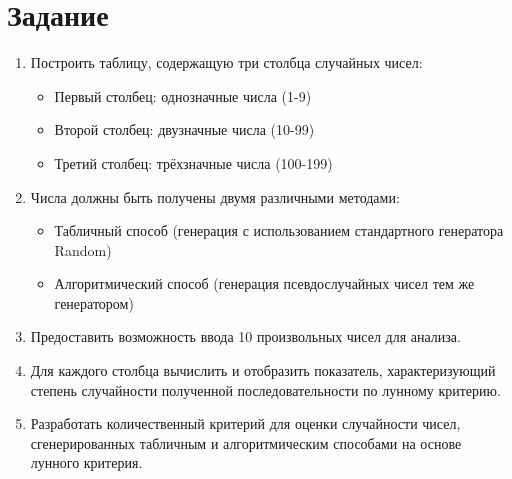 \section{Задание}
\begin{enumerate}
\item Построить таблицу, содержащую три столбца случайных чисел:
\begin{itemize}
\item Первый столбец: однозначные числа (1-9)
\item Второй столбец: двузначные числа (10-99)
\item Третий столбец: трёхзначные числа (100-199)
\end{itemize}

\item Числа должны быть получены двумя различными методами:
\begin{itemize}
\item Табличный способ (генерация с использованием стандартного генератора Random)
\item Алгоритмический способ (генерация псевдослучайных чисел тем же генератором)
\end{itemize}

\item Предоставить возможность ввода 10 произвольных чисел для анализа.

\item Для каждого столбца вычислить и отобразить показатель, характеризующий степень случайности полученной последовательности по лунному критерию.

\item Разработать количественный критерий для оценки случайности чисел, сгенерированных табличным и алгоритмическим способами на основе лунного критерия.
\end{enumerate}

\newpage

